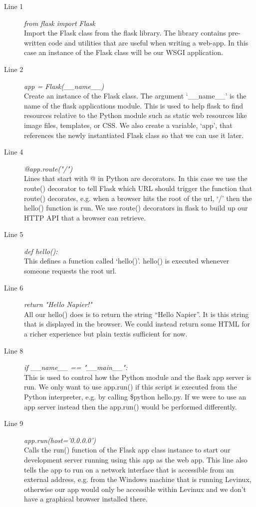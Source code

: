 \documentclass[12pt, a4paper, twoside]{book}
\begin{document}
\begin{description}
\item[Line 1] \emph{from flask import Flask}\\ 
Import the Flask class from the flask library. The library contains pre-written code and utilities that are useful when writing a web-app. In this case an instance of the Flask class will be our WSGI application.
\item[Line 2] \emph{app = Flask(\_\_name\_\_)}\\
Create an instance of the Flask class. The argument `\_\_name\_\_' is the name of the flask applications module. This is used to help flask to find resources relative to the Python module such as static web resources like image files, templates, or CSS. We also create a variable, `app', that references the newly instantiated Flask class so that we can use it later.
\item[Line 4] \emph{@app.route("/")}\\
Lines that start with @ in Python are decorators. In this case we use the route() decorator to tell Flask which URL should trigger the function that route() decorates, e.g. when a browser hits the root of the url, `/' then the hello() function is run. We use route() decorators in flask to build up our HTTP API that a browser can retrieve.
\item[Line 5] \emph{def hello():}\\
This defines a function called `hello()'. hello() is executed whenever someone requests the root url.
\item[Line 6] \emph{return "Hello Napier!"}\\
All our hello() does is to return the string ``Hello Napier''. It is this string that is displayed in the browser. We could instead return some HTML for a richer experience but plain textis sufficient for now.
\item[Line 8] \emph{if \_\_name\_\_ == "\_\_main\_\_":}\\
This is used to control how the Python module and the flask app server is run. We only want to use app.run() if this script is executed from the Python interpreter, e.g. by calling \$python hello.py. If we were to use an app server instead then the app.run() would be performed differently.
\item[Line 9] \emph{app.run(host='0.0.0.0')
}\\
Calls the run() function of the Flask app class instance to start our development server running using this app as the web app. This line also tells the app to run on a network interface that is accessible from an external address, e.g. from the Windows machine that is running Levinux, otherwise our app would only be accessible within Levinux and we don't have a graphical browser installed there.
\end{description}
\end{document}
